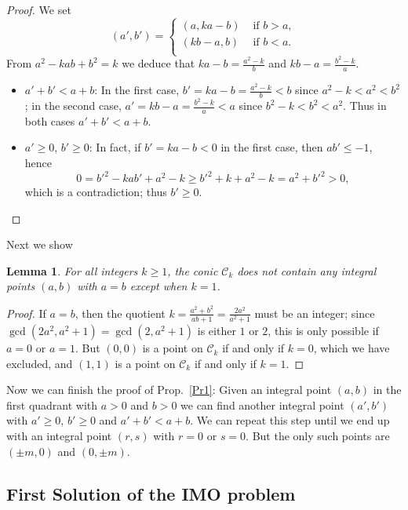 \documentclass{amsart}
\newtheorem{lemma}{Lemma}
\newcommand{\cC}{{\mathcal C}}
\begin{document}
\begin{proof}
  We set
  $$ (a',b') = \begin{cases}
    (a, ka-b) & \text{ if } b > a, \\
    (kb-a, b) & \text{ if } b < a. \\
  \end{cases} $$
  From $a^2 - kab + b^2 = k$ we deduce that
  $ka - b = \frac{a^2-k}b$ and $kb-a = \frac{b^2-k}a$. 
  \begin{itemize}
  \item  $a' + b' < a + b$: In the first case,
    $b' = ka - b = \frac{a^2-k}b < b$ since $a^2 - k < a^2 < b^2$;
    in the second case, $a' = kb-a  = \frac{b^2-k}a < a$ since
    $b^2 - k < b^2 < a^2$. Thus in both cases $a' + b' < a + b$.
  \item $a' \ge 0$, $b' \ge 0$: In fact, if
    $b' = ka-b < 0$ in the first case, then $ab' \le -1$, hence
    $$ 0 = {b'}^2 - kab' + a^2 - k \ge {b'}^2 + k + a^2 - k
         = a^2 + {b'^2} > 0, $$
    which is a contradiction; thus $b' \ge 0$.
  \end{itemize}  
\end{proof}

Next we show

\begin{lemma}
  For all integers $k \ge 1$, the conic $\cC_k$ does not contain any
  integral points $(a,b)$ with $a = b$ except when $k = 1$.
\end{lemma}

\begin{proof}
  If $a = b$, then the quotient
  $k = \frac{a^2 + b^2}{ab+1} = \frac{2a^2}{a^2+1}$ must be an integer;
  since $\gcd(2a^2, a^2+1) = \gcd(2,a^2+1)$ is either $1$ or $2$,
  this is only possible if $a = 0$ or $a = 1$. But $(0,0)$ is a point
  on $\cC_k$ if and only if $k = 0$, which we have excluded, and
  $(1,1)$ is a point on $\cC_k$ if and only if $k = 1$.
\end{proof}

Now we can finish the proof of Prop.~\ref{Pr1}:
Given an integral point $(a,b)$ in the first quadrant with
$a > 0$ and $b > 0$  we can find another integral point $(a',b')$ with
$a' \ge 0$, $b' \ge 0$ and $a' + b' < a + b$. We can repeat this step
until we end up with an integral point $(r,s)$ with $r = 0$ or $s = 0$.
But the only such points are $(\pm m, 0)$ and $(0, \pm m)$.

\subsection*{First Solution of the IMO problem}
\end{document}
